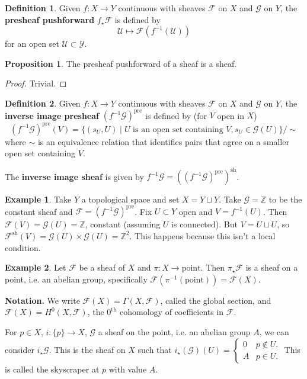 \documentclass{article}
\theoremstyle{definition}
\newtheorem{prop}[theorem]{Proposition}
\newtheorem{example}{Example}[section]
\newtheorem{defn}{Definition}[section]
\begin{document}
\begin{defn}
    Given $f: X \to Y$ continuous with sheaves $\mathcal{F}$ on $X$ and $\mathcal{G}$ on $Y$, the \textbf{presheaf pushforward} $f_{\star}\mathcal{F}$ is defined by \[
    \mathcal{U} \mapsto \mathcal{F}(f^{-1}(\mathcal{U}))
    \]
    for an open set $\mathcal{U} \subset \mathcal{Y}$. 
\end{defn}
\begin{prop}
    The presheaf pushforward of a sheaf is a sheaf.
\end{prop}
\begin{proof}
    Trivial.
\end{proof}
\begin{defn}
    Given $f: X \to Y$ continuous with sheaves $\mathcal{F}$ on $X$ and $\mathcal{G}$ on $Y$, the \textbf{inverse image presheaf} $(f^{-1}\mathcal{G})^{\text{pre}}$ is defined by (for $V$ open in $X$) \[
    (f^{-1}\mathcal{G})^{\text{pre}}(V) = \{(s_U,U) \mid U \text{ is an open set containing }V, s_U \in \mathcal{G}(U)\}/\sim
    \]
    where $\sim$ is an equivalence relation that identifies pairs that agree on a smaller open set containing $V$.
    \vspace{1mm}
     
    The \textbf{inverse image sheaf} is given by $f^{-1}\mathcal{G} = ((f^{-1}\mathcal{G})^{\text{pre}})^{\text{sh}}$.
\end{defn}
\begin{example}
    Take $Y$ a topological space and set $X = Y \sqcup Y$. Take $\mathcal{G} = \mathbb{Z}$ to be the constant sheaf and $\mathcal{F} = (f^{-1} \mathcal{G})^{\text{pre}}$. Fix $U \subset Y$ open and $V = f^{-1}(U)$. Then $\mathcal{F}(V) = \mathcal{G}(U) = \mathbb{Z}$, constant (assuming $U$ is connected). But $V = U \sqcup U$, so $\mathcal{F}^{\text{sh}}(V) = \mathcal{G}(U) \times \mathcal{G}(U) = \mathbb{Z}^2$. This happens because this isn't a local condition.
\end{example}
\begin{example}
    Let $\mathcal{F}$ be a sheaf of $X$ and $\pi : X \to \text{point}$. Then $\pi_{\star}\mathcal{F}$ is a sheaf on a point, i.e. an abelian group, specifically $\mathcal{F}(\pi^{-1}(\text{point})) = \mathcal{F}(X)$.
    \vspace{1mm}
     
    \textbf{Notation.} We write $\mathcal{F}(X) = \Gamma(X,\mathcal{F})$, called the global section, and $\mathcal{F}(X)=H^0(X,\mathcal{F})$, the $0^{\text{th}}$ cohomology of coefficients in $\mathcal{F}$.
    \vspace{1mm}
     
    For $p \in X$, $i : \{p\} \to X$, $\mathcal{G}$ a sheaf on the point, i.e. an abelian group $A$, we can consider $i_{\star}\mathcal{G}$. This is the sheaf on $X$ such that $i_{\star}(\mathcal{G})(U) = \begin{cases}
        0 & p \not\in U.\\
        A & p \in U.
    \end{cases}$ This is called the skyscraper at $p$ with value $A$.
\end{example}
\end{document}
